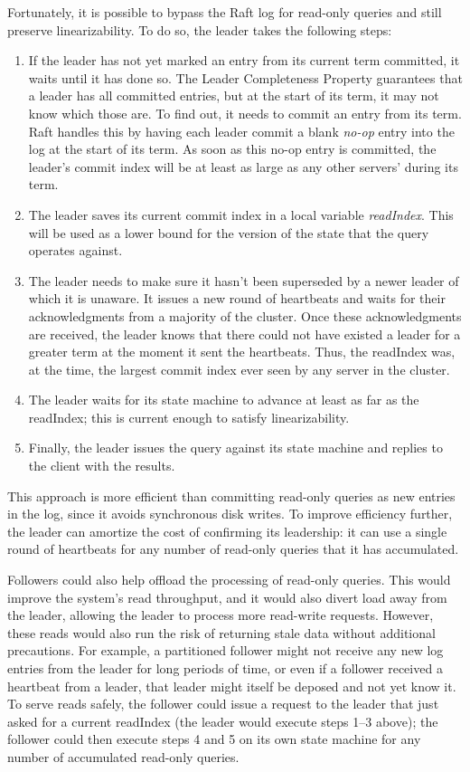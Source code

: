 Fortunately, it is possible to bypass the Raft log for read-only queries
and still preserve linearizability. To do so, the leader takes the
following steps:
%
%
\begin{enumerate}
%
\item If the leader has not yet marked an entry from its current term
committed, it waits until it has done so. The Leader Completeness
Property guarantees that a leader has all committed entries, but at the
start of its term, it may not know which those are. To find out, it
needs to commit an entry from its term. Raft handles this by having each
leader commit a blank \emph{no-op} entry into the log at the start of
its term. As soon as this no-op entry is committed, the leader's commit
index will be at least as large as any other servers' during its term.
%
\item The leader saves its current commit index in a local
variable
\emph{readIndex}. This will be used as a lower bound for the version
of the state that the query operates against.
%
\item The leader needs to make sure it hasn't been 
superseded by a newer leader of which it is unaware.
It issues a
new round of heartbeats and waits for their acknowledgments from a
majority of the cluster. Once these acknowledgments are received, the
leader knows that there could not have existed a leader for a greater
term at the moment it sent the heartbeats. Thus, the readIndex was, at
the time, the largest commit index ever seen by any server in the
cluster.
%
\item The leader waits for its state machine to advance at least as far
as the readIndex; this is current enough to satisfy
linearizability.
%
\item Finally, the leader issues the query against its state machine and
replies to the client with the results.
%
\end{enumerate}

This approach is more efficient than committing read-only queries as new
entries in the log, since it avoids synchronous disk writes. To improve
efficiency further, the leader can amortize the cost of confirming its
leadership: it can use a single round of heartbeats for any number of
read-only queries that it has accumulated.

Followers could also help offload the processing of read-only queries.
This would improve the system's read throughput, and it would also
divert load away from the leader, allowing the leader to process more
read-write requests. However, these reads would also run the risk of
returning stale data without additional precautions. For example, a
partitioned follower might not receive any new log entries from the
leader for long periods of time, or even if a follower received a
heartbeat from a leader, that leader might itself be deposed and not yet
know it. To serve reads safely, the follower could issue a request to
the leader that just asked for a current readIndex (the leader would
execute steps 1--3 above); the follower could then execute steps 4 and 5
on its own state machine for any number of accumulated read-only
queries.

